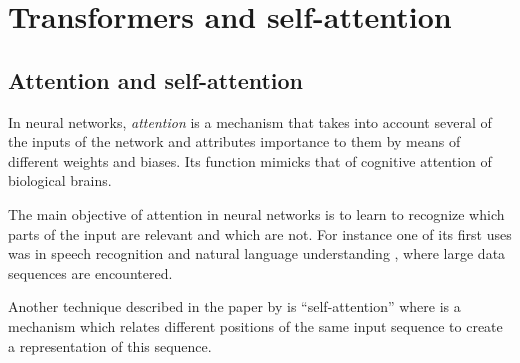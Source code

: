 \chapter{Transformers and self-attention}\label{sec:transformers}

\section{Attention and self-attention}

In neural networks, \textit{attention}\cite{article:attention} is a mechanism
that takes into account several of the inputs of the network
and attributes importance to them by means of different weights
and biases. Its function mimicks that of cognitive attention of
biological brains.

The main objective of attention in neural networks is to learn
to recognize which parts of the input are relevant and which are not.
For instance one of its first uses was in speech recognition and
natural language understanding \cite{bahdanau2014neural}, where
large data sequences are encountered.

Another technique described in the paper by \citet{article:attention}
is ``self-attention'' where is a mechanism which relates different positions
of the same input sequence to create a representation of this sequence.
